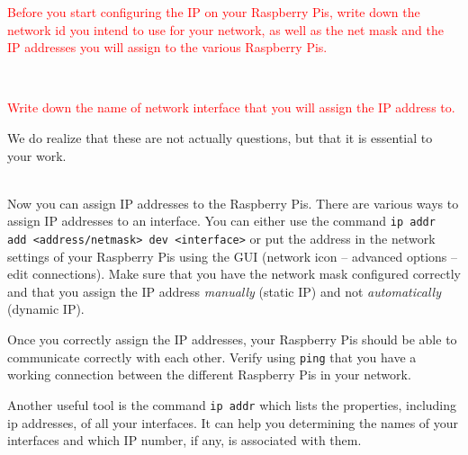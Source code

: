 \documentclass{article}
\begin{document}
\parbox[t]{14cm}{\textcolor{red}{Before you start configuring the IP on your Raspberry Pis, write down the network id you intend to use for your network, as well as the net mask and the IP addresses you will assign to the various Raspberry Pis.}}\\

\parbox[t]{14cm}{\textcolor{red}{Write down the name of network interface that you will assign the IP address to.}}

\parbox[t]{14cm}{We do realize that these are not actually questions, but that it is essential to your work.}\\

Now you can assign IP addresses to the Raspberry Pis. There are various ways to assign IP addresses to an interface.
You can either use the command \verb!ip addr add <address/netmask> dev <interface>! or put the address in the network settings of your Raspberry Pis using the GUI (network icon -- advanced options -- edit connections). Make sure that you have the network mask configured correctly and that you assign the IP address \emph{manually} (static IP) and not \emph{automatically} (dynamic IP).

Once you correctly assign the IP addresses, your Raspberry Pis should be able to communicate correctly with each other. Verify using \verb!ping! that you have a working connection between the different Raspberry Pis in your network.

Another useful tool is the command \verb!ip addr! which lists the properties, including ip addresses, of all your interfaces. It can help you determining the names of your interfaces and which IP number, if any, is associated with them.
\end{document}
